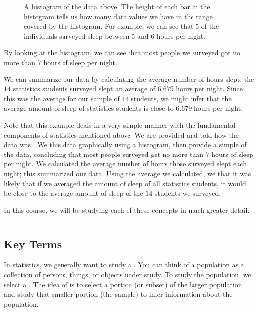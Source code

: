 \documentclass[letterpaper,10pt,english]{jupyterBook}
\begin{document}
\begin{figure}[htbp]
\centering
\capstart

\noindent{}
\caption{A histogram of the data above. The height of each bar in the histogram tells us how many data values we have in the range covered by the histogram. For example, we can see that 5 of the individuals surveyed sleep between 5 and 6 hours per night.}\label{\detokenize{Ch1 Sampling and Data/1.1 Key Terms in Statistics:intro-histogram}}\end{figure}

\sphinxAtStartPar
By looking at the histogram, we can see that most people we surveyed got no more than \(7\) hours of sleep per night.

\sphinxAtStartPar
We can summarize our data by calculating the average number of hours slept: the \(14\) statistics students surveyed slept an average of \(6.679\) hours per night. Since this was the average for our sample of \(14\) students, we might
infer that the average amount of sleep of  statistics students is close to \(6.679\) hours per night.

\sphinxAtStartPar
Note that this example deals in a very simple manner with the fundamental components of statistics mentioned above. We are provided  and told how the data was . We  this data graphically using a histogram, then provide a simple  of the data, concluding that most people surveyed get no more than \(7\) hours of sleep per night. We calculated the average number of hours those surveyed slept each night; this  summarized our data. Using the average we calculated, we  that it was likely that if we averaged the amount of sleep of all statistics students, it would be close to the average amount of sleep of the \(14\) students we surveyed.

\sphinxAtStartPar
In this course, we will be studying each of these concepts in much greater detail.


\bigskip\hrule\bigskip



\subsection{Key Terms}
\label{\detokenize{Ch1 Sampling and Data/1.1 Key Terms in Statistics:key-terms}}
\sphinxAtStartPar
In statistics, we generally want to study a . You can think of a population as a collection of persons, things, or objects under study. To study the population, we select a . The idea of  is to select a portion (or subset) of the larger population and study that smaller portion (the sample) to infer information about the population.
\end{document}

